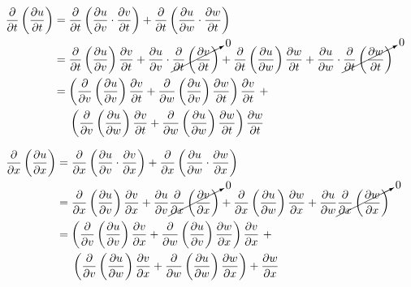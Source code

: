 \documentclass[11pt,fleqn]{book} %
\begin{document}
\begin{enumerate}
    $\begin{aligned}[t]
        \frac{\partial}{\partial t} \left( \frac{\partial u}{\partial t} \right)
         & = \frac{\partial}{\partial t} \left( \frac{\partial u}{\partial v} \cdot \frac{\partial v}{\partial t} \right) + \frac{\partial}{\partial t} \left( \frac{\partial u}{\partial w} \cdot \frac{\partial w}{\partial t} \right) \\
         & = \frac{\partial}{\partial t} \left( \frac{\partial u}{\partial v} \right) \frac{\partial v}{\partial t} + \frac{\partial u}{\partial v} \cdot \cancelto{0}{\frac{\partial}{\partial t} \left( \frac{\partial v}{\partial t} \right)} + \frac{\partial}{\partial t} \left( \frac{\partial u}{\partial w} \right) \frac{\partial w}{\partial t} + \frac{\partial u}{\partial w} \cdot \cancelto{0}{\frac{\partial}{\partial t} \left( \frac{\partial w}{\partial t} \right)} \\
         & = \left( \frac{\partial}{\partial v} \left( \frac{\partial u}{\partial v} \right) \frac{\partial v}{\partial t} + \frac{\partial}{\partial w} \left( \frac{\partial u}{\partial v} \right) \frac{\partial w}{\partial t} \right) \frac{\partial v}{\partial t} ~+ \\ &~~~~ \left( \frac{\partial}{\partial v} \left( \frac{\partial u}{\partial w} \right) \frac{\partial v}{\partial t} + \frac{\partial}{\partial w} \left( \frac{\partial u}{\partial w} \right) \frac{\partial w}{\partial t} \right) \frac{\partial w}{\partial t}
    \end{aligned}$

    $\begin{aligned}[t]
        \frac{\partial}{\partial x} \left( \frac{\partial u}{\partial x} \right) 
         & = \frac{\partial}{\partial x} \left( \frac{\partial u}{\partial v} \cdot \frac{\partial v}{\partial x} \right) + \frac{\partial}{\partial x} \left( \frac{\partial u}{\partial w} \cdot \frac{\partial w}{\partial x} \right) \\
         & = \frac{\partial}{\partial x} \left( \frac{\partial u}{\partial v} \right) \frac{\partial v}{\partial x} + \frac{\partial u}{\partial v} \cancelto{0}{\frac{\partial}{\partial x} \left( \frac{\partial v}{\partial x} \right)} + \frac{\partial}{\partial x} \left( \frac{\partial u}{\partial w} \right) \frac{\partial w}{\partial x} + \frac{\partial u}{\partial w} \cancelto{0}{\frac{\partial}{\partial x} \left( \frac{\partial w}{\partial x} \right)} \\
         & = \left( \frac{\partial}{\partial v} \left( \frac{\partial u}{\partial v} \right) \frac{\partial v}{\partial x} + \frac{\partial}{\partial w} \left( \frac{\partial u}{\partial v} \right) \frac{\partial w}{\partial x} \right) \frac{\partial v}{\partial x} ~+ \\ &~~~~ \left( \frac{\partial}{\partial v} \left( \frac{\partial u}{\partial w} \right) \frac{\partial v}{\partial x} + \frac{\partial}{\partial w} \left( \frac{\partial u}{\partial w} \right) \frac{\partial w}{\partial x} \right) + \frac{\partial w}{\partial x}
    \end{aligned}$


\end{enumerate}
\end{document}
